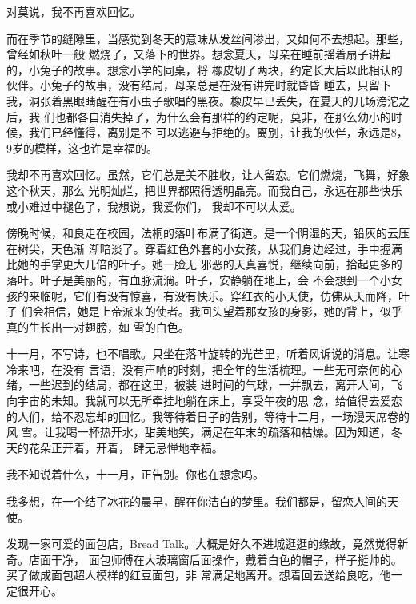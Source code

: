 		对莫说，我不再喜欢回忆。

		而在季节的缝隙里，当感觉到冬天的意味从发丝间渗出，又如何不去想起。那些，曾经如秋叶一般
	燃烧了，又落下的世界。想念夏天，母亲在睡前摇着扇子讲起的，小兔子的故事。想念小学的同桌，将
	橡皮切了两块，约定长大后以此相认的伙伴。小兔子的故事，没有结局，母亲总是在没有讲完时就昏昏
	睡去，只留下我，洞张着黑眼睛醒在有小虫子歌唱的黑夜。橡皮早已丢失，在夏天的几场滂沱之后，我
	们也都各自消失掉了，为什么会有那样的约定呢，莫非，在那么幼小的时候，我们已经懂得，离别是不
	可以逃避与拒绝的。离别，让我的伙伴，永远是8，9岁的模样，这也许是幸福的。

		我却不再喜欢回忆。虽然，它们总是美不胜收，让人留恋。它们燃烧，飞舞，好象这个秋天，那么
	光明灿烂，把世界都照得透明晶亮。而我自己，永远在那些快乐或小难过中褪色了，我想说，我爱你们，
	我却不可以太爱。


		傍晚时候，和良走在校园，法桐的落叶布满了街道。是一个阴湿的天，铅灰的云压在树尖，天色渐
	渐暗淡了。穿着红色外套的小女孩，从我们身边经过，手中握满比她的手掌更大几倍的叶子。她一脸无
	邪恶的天真喜悦，继续向前，拾起更多的落叶。叶子是美丽的，有血脉流淌。叶子，安静躺在地上，会
	不会想到一个小女孩的来临呢，它们有没有惊喜，有没有快乐。穿红衣的小天使，仿佛从天而降，叶子
	们会相信，她是上帝派来的使者。我回头望着那女孩的身影，她的背上，似乎真的生长出一对翅膀，如
	雪的白色。


		十一月，不写诗，也不唱歌。只坐在落叶旋转的光芒里，听着风诉说的消息。让寒冷来吧，在没有
	言语，没有声响的时刻，把全年的生活梳理。一些无可奈何的心绪，一些迟到的结局，都在这里，被装
	进时间的气球，一并飘去，离开人间，飞向宇宙的未知。我就可以无所牵挂地躺在床上，享受午夜的思
	念，给值得去爱恋的人们，给不忍忘却的回忆。我等待着日子的告别，等待十二月，一场漫天席卷的风
	雪。让我喝一杯热开水，甜美地笑，满足在年末的疏落和枯燥。因为知道，冬天的花朵正开着，开着，
	肆无忌惮地幸福。


		我不知说着什么，十一月，正告别。你也在想念吗。

		我多想，在一个结了冰花的晨早，醒在你洁白的梦里。我们都是，留恋人间的天使。

	\endwriting




		发现一家可爱的面包店，Bread Talk。大概是好久不进城逛逛的缘故，竟然觉得新奇。店面干净，
	面包师傅在大玻璃窗后面操作，戴着白色的帽子，样子挺帅的。买了做成面包超人模样的红豆面包，非
	常满足地离开。想着回去送给良吃，他一定很开心。

